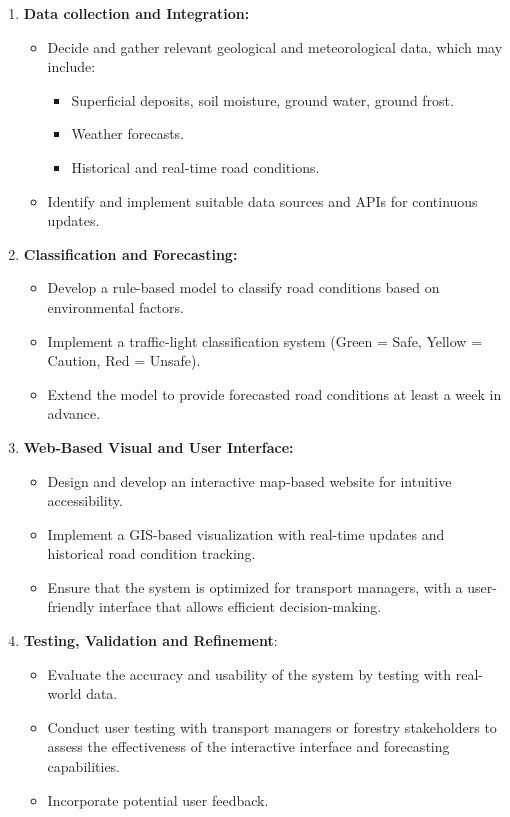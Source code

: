 \begin{enumerate}
    \item \textbf{Data collection and Integration:}
    \begin{itemize}
        \item Decide and gather relevant geological and meteorological data, which may include:
        \begin{itemize}
            \item Superficial deposits, soil moisture, ground water, ground frost.
            \item Weather forecasts.
            \item Historical and real-time road conditions.
        \end{itemize}
        \item Identify and implement suitable data sources and APIs for continuous updates.
    \end{itemize}
    
    \item \textbf{Classification and Forecasting:}
    \begin{itemize}
        \item Develop a rule-based model to classify road conditions based on environmental factors.  
        \item Implement a traffic-light classification system (Green = Safe, Yellow = Caution, Red = Unsafe).  
        \item Extend the model to provide forecasted road conditions at least a week in advance.  
    \end{itemize}
    
    \item \textbf{Web-Based Visual and User Interface:}
    \begin{itemize}
        \item Design and develop an interactive map-based website for intuitive accessibility.
        \item Implement a GIS-based visualization with real-time updates and historical road condition tracking. 
        \item Ensure that the system is optimized for transport managers, with a user-friendly interface that allows efficient decision-making. 
    \end{itemize}
    
    \item \textbf{Testing, Validation and Refinement}:
    \begin{itemize}
        \item Evaluate the accuracy and usability of the system by testing with real-world data.
        \item Conduct user testing with transport managers or forestry stakeholders to assess the effectiveness of the interactive interface and forecasting capabilities.
        \item Incorporate potential user feedback.
    \end{itemize} 
    

\end{enumerate}
